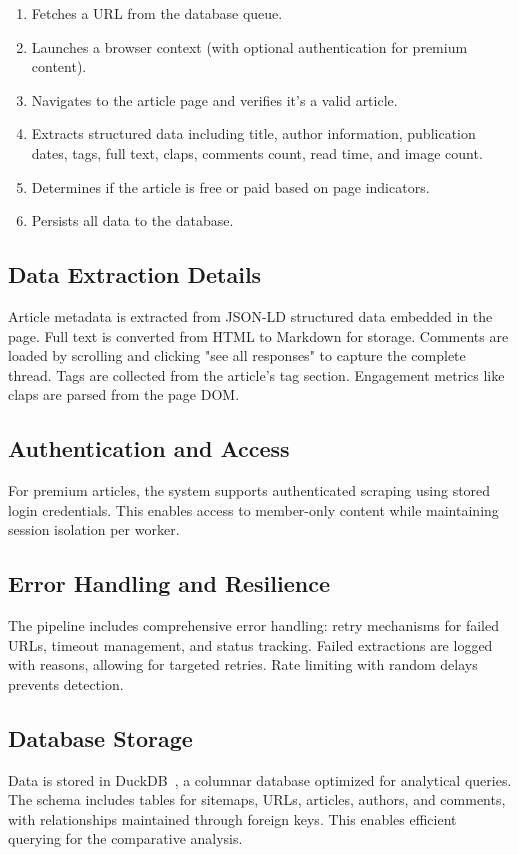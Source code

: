 \documentclass[11pt,a4paper]{article}
\begin{document}
\begin{enumerate}
  \item Fetches a URL from the database queue.
  \item Launches a browser context (with optional authentication for premium content).
  \item Navigates to the article page and verifies it's a valid article.
  \item Extracts structured data including title, author information, publication dates, tags, full text, claps, comments count, read time, and image count.
  \item Determines if the article is free or paid based on page indicators.
  \item Persists all data to the database.
\end{enumerate}

\subsection{Data Extraction Details}
Article metadata is extracted from JSON-LD structured data embedded in the page. Full text is converted from HTML to Markdown for storage. Comments are loaded by scrolling and clicking "see all responses" to capture the complete thread. Tags are collected from the article's tag section. Engagement metrics like claps are parsed from the page DOM.

\subsection{Authentication and Access}
For premium articles, the system supports authenticated scraping using stored login credentials. This enables access to member-only content while maintaining session isolation per worker.

\subsection{Error Handling and Resilience}
The pipeline includes comprehensive error handling: retry mechanisms for failed URLs, timeout management, and status tracking. Failed extractions are logged with reasons, allowing for targeted retries. Rate limiting with random delays prevents detection.

\subsection{Database Storage}
Data is stored in DuckDB~\cite{duckdb}, a columnar database optimized for analytical queries. The schema includes tables for sitemaps, URLs, articles, authors, and comments, with relationships maintained through foreign keys. This enables efficient querying for the comparative analysis.
\end{document}
